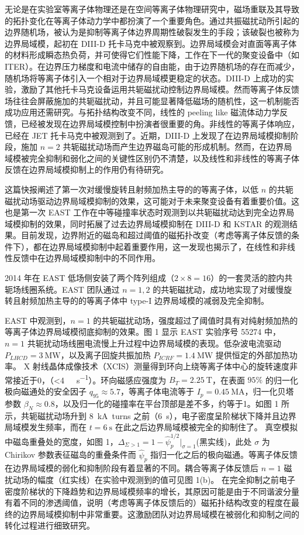 无论是在实验室等离子体物理还是在空间等离子体物理研究中，磁场重联及其导致的拓扑变化在等离子体动力学中都扮演了一个重要角色。通过共振磁扰动所引起的边界随机场，被认为是抑制等离子体边界周期性破裂发生的手段；该破裂也被称为边界局域模，起初在 DIII-D 托卡马克中被观察到。边界局域模会对直面等离子体的材料形成瞬态热负荷，并可使得它们性能下降，工作在下一代的聚变设备中（如 ITER）。在边界压力梯度和电流中储存的自由能，由于边界随机场的存在而减少，随机场将等离子体引入一个相对于边界局域模更稳定的状态。DIII-D 上成功的实验，激励了其他托卡马克设备运用共轭磁扰动控制边界局域模。然而等离子体反馈场往往会屏蔽施加的共轭磁扰动，并且可能显著降低磁场的随机性，这一机制能否成功应用还需研究。与拓扑结构改变不同，线性的 peeling like 磁流体动力学反馈，已经被发现在边界局域模控制中扮演者很重要的角。非线性的等离子体响应，已经在 JET 托卡马克中被观测到了。近期，DIII-D 上发现了在边界局域模抑制阶段，施加 $n=2$ 共轭磁扰动场而产生边界磁岛可能的形成机制。然而，在边界局域模被完全抑制和弱化之间的关键性区别仍不清楚，以及线性和非线性的等离子体反馈在边界局域模抑制上的作用仍有待研究。

这篇快报阐述了第一次对缓慢旋转且射频加热主导的的等离子体，以低 $n$ 的共轭磁扰动场驱动边界局域模抑制的效果，这可能对于未来聚变设备有着重要价值。这也是第一次 EAST 工作在中等碰撞率状态时观测到以共轭磁扰动达到完全边界局域模抑制的效果，同时拓展了过去边界局域模抑制在 DIII-D 和 KSTAR 的观测结果。目前发现，边界附近的磁岛和超过阈值的磁拓扑改变（考虑等离子体反馈的条件下），都在边界局域模抑制中起着重要作用，这一发现也揭示了，在线性和非线性反馈中在边界局域模抑制中的不同作用。

2014 年在 EAST 低场侧安装了两个阵列组成（$2×8=16$）的一套灵活的腔内共轭场线圈系统。EAST 团队通过 $n=1,2$ 的共轭磁扰动，成功地实现了对缓慢旋转且射频加热主导的的等离子体中 type-I 边界局域模的减弱及完全抑制。

EAST 中观测到，$n=1$ 的共轭磁扰动场，强度超过了阈值时具有对纯射频加热的等离子体边界局域模彻底抑制的效果。图 1 显示 EAST 实验序号 55274 中，$n=1$ 共轭扰动场线圈电流慢上升过程中边界局域模的表现。低杂波电流驱动 $P_{LHCD}=\SI{3}{\mega\watt}$，以及离子回旋共振加热 $P_{ICRF}=\SI{1.4}{\mega\watt}$ 提供恒定的外部加热功率。 X 射线晶体成像技术（XCIS）测量得到环向上绕等离子体中心的旋转速度非常接近于0，（<\SI{4}{\kilo\rad\per\second}）。环向磁感应强度为 $B_T = \SI{2.25}{\tesla}$，在表面 $95\%$ 的归一化极向磁通处的安全因子 $q_{95}\approx 5.7$，等离子体电流等于 $I_p=\SI{0.45}{\mega\ampere}$，归一化贝塔参数 $\beta_N \approx 0.8$，以及归一化的碰撞率在平台顶部是差不多，约等于1。如图 1 所示，共轭磁扰动场升到 \SI{8}{\kilo\ampere turns} 之前（\SI{6}{\second}），电子密度呈阶梯状下降并且边界局域模发生频率，而在 $t=\SI{6}{\second}$ 在此之后边界局域模被完全的抑制住了。
真空模拟中磁岛重叠处的宽度，如图 1，$\Delta_{\Sigma>1}=1-\hat{\psi}_p^{1/2}|_{\sigma=1}$(黑实线)，此处 $\sigma$ 为 Chirikov 参数表征磁岛的重叠条件而 $\hat{\psi}_p$ 指归一化之后的极向磁通。等离子体反馈在边界局域模的弱化和抑制阶段有着显著的不同。耦合等离子体反馈后 $n=1$ 磁扰动场的幅度（红实线）在实验中观测到的值可见图 1(b)。
在完全抑制之前电子密度阶梯状的下降趋势和边界局域模频率的增长，其原因可能是由于不同谐波分量有着不同的渗透阈值，说明（考虑等离子体反馈后的）磁拓扑结构改变的程度在最终的边界局域模抑制中非常重要。这激励团队对边界局域模在被弱化和抑制之间的转化过程进行细致研究。


